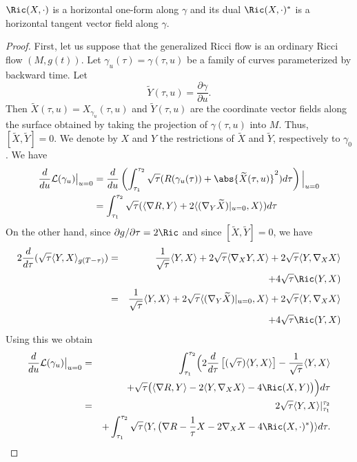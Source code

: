 \begin{remark}\label{rem:ricci-one-form-dual}
$\Ric(X,\cdot)$ is a horizontal one-form along $\gamma$ and its
dual $\Ric(X,\cdot)^*$ is a horizontal tangent vector field
along $\gamma$.
\end{remark}

\begin{proof}
First, let us suppose that the
generalized Ricci flow is an ordinary Ricci flow $(M,g(t))$. Let
$\gamma_u(\tau)=\gamma(\tau,u)$ be a family of curves parameterized
by backward time. Let
$$\widetilde Y(\tau,u)=\frac{\partial\gamma}{\partial u}.$$ Then $\widetilde X(\tau,u)=X_{\gamma_u}(\tau,u)$
 and $\widetilde Y(\tau,u)$
are  the coordinate vector fields along the surface obtained by taking the
projection of $\gamma(\tau,u)$ into $M$. Thus, $[\widetilde X,\widetilde Y]
=0$. We denote by $X$ and $Y$ the restrictions of $\widetilde X$ and
$\widetilde Y$, respectively to $\gamma_0$. We have
\begin{align*}
\frac{d}{du}\mathcal{L}(\gamma_{u})\bigl|_{u=0}\bigr.  & =
\frac{d}{du}\left(\int_{\tau_{1}}^{\tau_{2}}
\sqrt{\tau}(R(\gamma_u(\tau)) + \abs{\widetilde
X(\tau,u)}^{2})d\tau\right)\Bigl|_{u=0}\Bigr.
\\&=\int_{\tau_{1}}^{\tau_{2}} \sqrt{\tau}(\langle \nabla R, Y\rangle  +
2\langle (\nabla_{Y}\widetilde X)|_{u=0},X\rangle )d\tau
\end{align*}
On the other hand, since $\partial g/\partial \tau =2\Ric$ and
since $[\widetilde X,\widetilde Y]=0$, we have
\begin{eqnarray*} 2\frac{d}{d\tau}(\sqrt{\tau}\langle Y,X\rangle_{g(T-\tau)} )
& = & \frac{1}{\sqrt{\tau}}\langle Y,X\rangle +
2\sqrt{\tau}\langle\nabla_XY,X\rangle
+2\sqrt{\tau}\langle Y,\nabla_XX\rangle \\ & & +4\sqrt{\tau}\Ric(Y,X) \\
& = & \frac{1}{\sqrt{\tau}}\langle Y,X\rangle  +
2\sqrt{\tau}\langle(\nabla_Y\widetilde X)|_{u=0},X\rangle
+2\sqrt{\tau}\langle Y,\nabla_XX\rangle \\ & &  +4\sqrt{\tau}\Ric(Y,X)
\end{eqnarray*}
Using this we obtain \begin{eqnarray}\nonumber \frac{d}{du}
\mathcal{L}(\gamma_u)\bigl|_{u=0}\bigr. & = & \int_{\tau_1}^{\tau_2}
\Bigl(2\frac{d}{d\tau}\left[(\sqrt{\tau})\langle
Y,X\rangle\right]-\frac{1}{\sqrt{\tau}}\langle
Y,X\rangle\Bigr. \\
& & +\sqrt{\tau}\bigl(\langle\nabla R,Y\rangle
 - 2\langle Y,\nabla_{X}X\rangle  - 4\Ric(X,Y)\bigr)\Bigr)d\tau \nonumber \\
 & = & 2\sqrt{\tau}\langle Y,X\rangle |_{\tau_{1}}^{\tau_{2}} \nonumber \\
& & + \int_{\tau_{1}}^{\tau_{2}} \sqrt{\tau}\langle Y,\bigl(\nabla R
- \frac{1}{\tau}X - 2\nabla_{X}X - 4\Ric(X,\cdot)^*\bigr)\rangle d\tau.\label{variation}
\end{eqnarray}


\end{proof}
